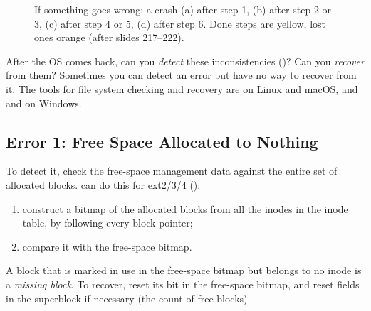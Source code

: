 \begin{figure}[H]
\caption{If something goes wrong: a crash (a) after step 1, (b) after step 2 or 3, (c) after step 4 or 5, (d) after step 6. Done steps are yellow, lost ones orange (after slides 217--222).}
\label{fig:crash}
\end{figure}

After the OS comes back, can you \emph{detect} these inconsistencies ()? Can you \emph{recover} from them? Sometimes you can detect an error but have no way to recover from it. The tools for file system checking and recovery are  on Linux and macOS, and  and  on Windows.

\subsection{Error 1: Free Space Allocated to Nothing}

To detect it, check the free-space management data against the entire set of allocated blocks.  can do this for ext2/3/4 ():
\begin{enumerate}
  \item construct a bitmap of the allocated blocks from all the inodes in the inode table, by following every block pointer;
  \item compare it with the free-space bitmap.
\end{enumerate}
A block that is marked in use in the free-space bitmap but belongs to no inode is a \emph{missing block}. To recover, reset its bit in the free-space bitmap, and reset fields in the superblock if necessary (the count of free blocks).

